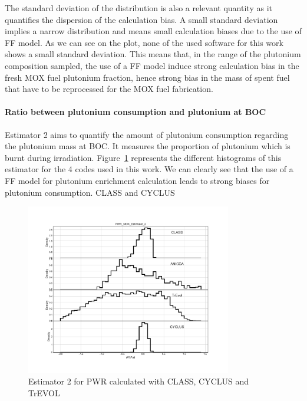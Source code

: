 The standard deviation of the distribution is also a relevant quantity as it quantifies the dispersion of the calculation bias. A small standard deviation implies a narrow distribution and means small calculation biases due to the use of FF model. As we can see on the plot, none of the used software for this work shows a small standard deviation. This means that, in the range of the plutonium composition sampled, the use of a FF model induce strong calculation bias in the fresh MOX fuel plutonium fraction, hence strong bias in the mass of spent fuel that have to be reprocessed for the MOX fuel fabrication.

\paragraph{Ratio between plutonium consumption and plutonium at BOC}
Estimator 2 aims to quantify the amount of plutonium consumption regarding the plutonium mass at BOC. It measures the proportion of plutonium which is burnt during irradiation. Figure~\ref{fig:Est2_PWR} represents the different histograms of this estimator for the 4 codes used in this work. We can clearly see that the use of a FF model for plutonium enrichment calculation leads to strong biases for plutonium consumption. CLASS and CYCLUS  
\begin{figure}[h]
	\begin{center}
		\includegraphics[width = 0.8\textwidth]{../../Feature_1/RAW_DATA/FIG/PWR_MOX_Estimator_2.pdf}
		\caption{Estimator 2 for PWR calculated with CLASS, CYCLUS and TrEVOL}
		\label{fig:Est2_PWR}
	\end{center}
\end{figure}


